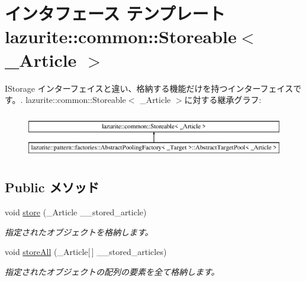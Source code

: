 \hypertarget{interfacelazurite_1_1common_1_1_storeable_3_01___article_01_4}{
\section{インタフェース テンプレート lazurite::common::Storeable$<$ \_\-Article $>$}
\label{interfacelazurite_1_1common_1_1_storeable_3_01___article_01_4}
}


IStorage インターフェイスと違い、格納する機能だけを持つインターフェイスです。.  
lazurite::common::Storeable$<$ \_\-Article $>$に対する継承グラフ:\begin{figure}[H]
\begin{center}
\leavevmode
\includegraphics[height=2cm]{interfacelazurite_1_1common_1_1_storeable_3_01___article_01_4}
\end{center}
\end{figure}
\subsection*{Public メソッド}
\begin{DoxyCompactItemize}
\item 
void \hyperlink{interfacelazurite_1_1common_1_1_storeable_3_01___article_01_4_ac97bf94535cb939fd12d123afe95fcd4}{store} (\_\-Article \_\-\_\-stored\_\-article)
\begin{DoxyCompactList}\small\item\em 指定されたオブジェクトを格納します。 \item\end{DoxyCompactList}\item 
void \hyperlink{interfacelazurite_1_1common_1_1_storeable_3_01___article_01_4_ae96e27826bb2346355b9a2c226f80276}{storeAll} (\_\-Article\mbox{[}$\,$\mbox{]} \_\-\_\-stored\_\-articles)
\begin{DoxyCompactList}\small\item\em 指定されたオブジェクトの配列の要素を全て格納します。 \item\end{DoxyCompactList}\end{DoxyCompactItemize}
